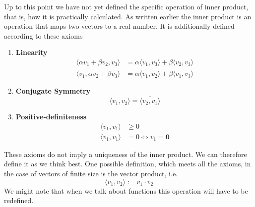 Up to this point we have not yet defined the specific operation of inner product, that is, how it is practically calculated.\newline
As written earlier the inner product is an operation that maps two vectors to a real number. It is additionally defined according to these axioms
\begin{enumerate}
\item \textbf{Linearity}
\begin{align*}
\langle \alpha v_1 + \beta v_2, v_3 \rangle &= \alpha \langle v_1, v_3 \rangle + \beta \langle v_2, v_3 \rangle \\
\langle v_1, \alpha v_2 + \beta v_3 \rangle &= \overline{\alpha} \langle v_1, v_2 \rangle + \overline{\beta} \langle v_1, v_3 \rangle
\end{align*}
\item \textbf{Conjugate Symmetry}
\begin{equation*}
\langle v_1, v_2 \rangle = \overline{ \langle v_2, v_1 \rangle}
\end{equation*}
\item \textbf{Positive-definiteness}
\begin{align*}
\langle v_1, v_1 \rangle &\geq 0 \\
\langle v_1, v_1 \rangle &= 0 \iff v_1= \mathbf{0} 
\end{align*}
\end{enumerate}
These axioms do not imply a uniqueness of the inner product. We can therefore define it as we think best.\newline
One possible definition, which meets all the axioms, in the case of vectors of finite size is the vector product, i.e.
\begin{equation*}
\langle v_1,v_2 \rangle := v_1 \cdot \overline{v_2}
\end{equation*}
We might note that when we talk about functions this operation will have to be redefined.

